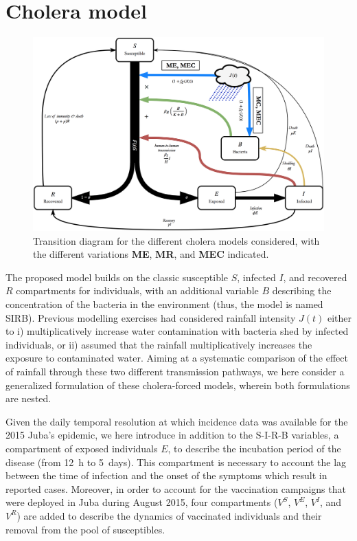 \section{Cholera model}
\label{sec:meth}
\begin{figure}
  \centering
  \includegraphics[width=\textwidth]{fig_cholera-rainfall/Lemaitre_ACTROP_2018_42_R1_fig1.png}
  \caption{Transition diagram for the different cholera models considered, with the different variations \textbf{ME}, \textbf{MR}, and \textbf{MEC} indicated.}
  \label{diagram}
\end{figure}

The proposed model builds on the classic susceptible $S$, infected $I$, and recovered $R$ compartments for individuals, with an additional variable $B$ describing the concentration of the bacteria in the environment (thus, the model is named SIRB). Previous modelling exercises had considered rainfall intensity $J(t)$ either to i) multiplicatively increase water contamination with bacteria shed by infected individuals\cite{Bertuzzo:ProbabilityExtinctionHaiti:2016,Pasetto:RealtimeProjectionsCholera:2017}, or ii) assumed that the rainfall multiplicatively increases the exposure to contaminated water\cite{Eisenberg:ExaminingRainfallCholera:2013}. Aiming at a systematic comparison of the effect of rainfall through these two different transmission pathways, we here consider a generalized formulation of these cholera-forced models, wherein both formulations are nested.

Given the daily temporal resolution at which incidence data was available for the 2015 Juba's epidemic, we here introduce in addition to the S-I-R-B variables, a compartment of exposed individuals $E$, to describe the incubation period of the disease (from 12~h to 5~days\cite{Azman:IncubationPeriodCholera:2013}). This compartment is necessary to account the lag between the time of infection and the onset of the symptoms which result in reported cases. Moreover, in order to account for the vaccination campaigns that were deployed in Juba during August 2015, four compartments ($V^S$, $V^E$, $V^I$, and $V^R$) are added to describe the dynamics of vaccinated individuals and their removal from the pool of susceptibles.

